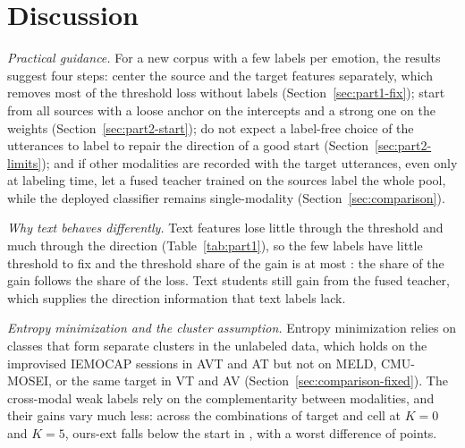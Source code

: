 \section{Discussion}
\label{sec:discussion}

\emph{Practical guidance.}
For a new corpus with a few labels per emotion, the results suggest four steps: center the source and the target features separately, which removes most of the threshold loss without labels (Section~\ref{sec:part1-fix}); start from all sources with a loose anchor on the intercepts and a strong one on the weights (Section~\ref{sec:part2-start}); do not expect a label-free choice of the utterances to label to repair the direction of a good start (Section~\ref{sec:part2-limits}); and if other modalities are recorded with the target utterances, even only at labeling time, let a fused teacher trained on the sources label the whole pool, while the deployed classifier remains single-modality (Section~\ref{sec:comparison}).

\emph{Why text behaves differently.}
Text features lose little through the threshold and much through the direction (Table~\ref{tab:part1}), so the few labels have little threshold to fix and the threshold share of the gain is at most : the share of the gain follows the share of the loss. Text students still gain from the fused teacher, which supplies the direction information that text labels lack.

\emph{Entropy minimization and the cluster assumption.}
Entropy minimization relies on classes that form separate clusters in the unlabeled data, which holds on the improvised IEMOCAP sessions in AVT and AT but not on MELD, CMU-MOSEI, or the same target in VT and AV (Section~\ref{sec:comparison-fixed}).
The cross-modal weak labels rely on the complementarity between modalities, and their gains vary much less: across the  combinations of target and cell at $K=0$ and $K=5$, ours-ext falls below the start in , with a worst difference of  points.

